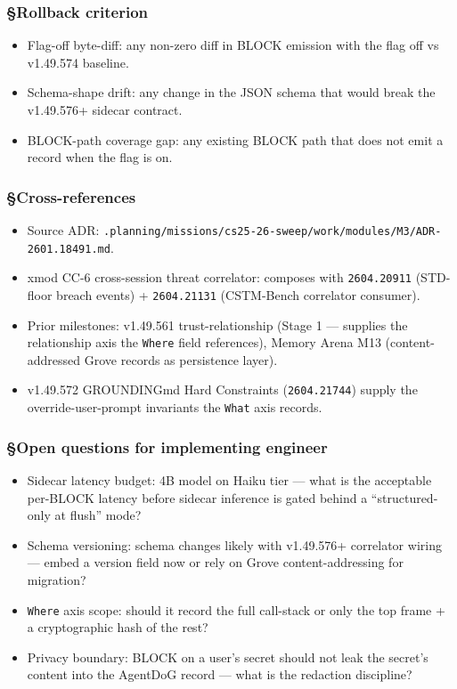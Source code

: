 \documentclass[11pt,letterpaper]{article}
\newcommand{\arxivid}[1]{\texttt{\textcolor{accent}{#1}}}
\providecommand{\tightlist}{\setlength{\itemsep}{0pt}\setlength{\parskip}{0pt}}
\begin{document}
\subsubsection{§Rollback criterion}

\begin{itemize}
\tightlist
\item
  Flag-off byte-diff: any non-zero diff in BLOCK emission with the flag
  off vs v1.49.574 baseline.
\item
  Schema-shape drift: any change in the JSON schema that would break the
  v1.49.576+ sidecar contract.
\item
  BLOCK-path coverage gap: any existing BLOCK path that does not emit a
  record when the flag is on.
\end{itemize}

\subsubsection{§Cross-references}

\begin{itemize}
\tightlist
\item
  Source ADR:
  \texttt{.planning/missions/cs25-26-sweep/work/modules/M3/ADR-\arxivid{2601.18491}.md}.
\item
  xmod CC-6 cross-session threat correlator: composes with
  \arxivid{2604.20911} (STD-floor breach events) + \arxivid{2604.21131}
  (CSTM-Bench correlator consumer).
\item
  Prior milestones: v1.49.561 trust-relationship (Stage 1 --- supplies
  the relationship axis the \texttt{Where} field references), Memory
  Arena M13 (content-addressed Grove records as persistence layer).
\item
  v1.49.572 GROUNDINGmd Hard Constraints (\arxivid{2604.21744}) supply
  the override-user-prompt invariants the \texttt{What} axis records.
\end{itemize}

\subsubsection{§Open questions for implementing
engineer}

\begin{itemize}
\tightlist
\item
  Sidecar latency budget: 4B model on Haiku tier --- what is the
  acceptable per-BLOCK latency before sidecar inference is gated behind
  a ``structured-only at flush'' mode?
\item
  Schema versioning: schema changes likely with v1.49.576+ correlator
  wiring --- embed a version field now or rely on Grove
  content-addressing for migration?
\item
  \texttt{Where} axis scope: should it record the full call-stack or
  only the top frame + a cryptographic hash of the rest?
\item
  Privacy boundary: BLOCK on a user's secret should not leak the
  secret's content into the AgentDoG record --- what is the redaction
  discipline?
\end{itemize}
\end{document}
